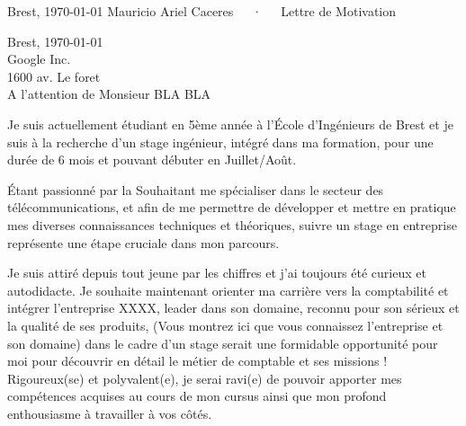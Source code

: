 \documentclass[11pt, a4paper]{awesome-cv}
\begin{document}
\makecvheader

\makecvfooter
  {Brest, \today}
  {Mauricio Ariel Caceres~~~·~~~Lettre de Motivation}
  {}


\begin{flushright}
	Brest, \today \\
	Google Inc.\\
	1600 av. Le foret\\
	A l'attention de Monsieur BLA BLA\\
\end{flushright}
\makelettertitle

\begin{cvletter}
	
Je suis actuellement étudiant en 5ème année à l’École d'Ingénieurs de Brest et je suis à la recherche d’un stage ingénieur, intégré dans ma formation, pour une durée de 6 mois et pouvant débuter en Juillet/Août.

 Étant passionné par la 
 Souhaitant me spécialiser dans le secteur des télécommunications, et afin de me permettre
 de développer et mettre en pratique mes diverses connaissances techniques et théoriques,
 suivre un stage en entreprise représente une étape cruciale dans mon parcours.
 
Je suis attiré depuis tout jeune par les chiffres et j’ai toujours été curieux et autodidacte. Je souhaite maintenant orienter ma carrière vers la comptabilité et intégrer l'entreprise XXXX, leader dans son domaine, reconnu pour son sérieux et la qualité de ses produits, (Vous montrez ici que vous connaissez l'entreprise et son domaine) dans le cadre d'un stage serait une formidable opportunité pour moi pour découvrir en détail le métier de comptable et ses missions !
Rigoureux(se) et polyvalent(e), je serai ravi(e) de pouvoir apporter mes compétences acquises au cours de mon cursus ainsi que mon profond enthousiasme à travailler à vos côtés.


\end{cvletter}


\makeletterclosing
\end{document}
